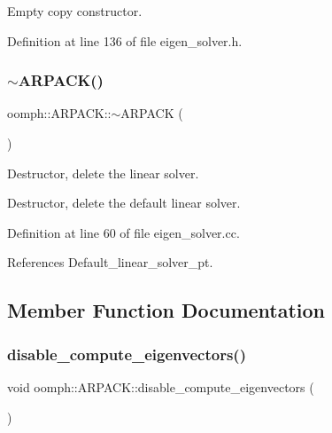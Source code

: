 Empty copy constructor. 



Definition at line 136 of file eigen\+\_\+solver.\+h.

\mbox{\label{classoomph_1_1ARPACK_a67b999708483787f4211a15feb71ed11}} 
\subsubsection{\texorpdfstring{$\sim$\+A\+R\+P\+A\+C\+K()}{~ARPACK()}}
{\footnotesize\ttfamily oomph\+::\+A\+R\+P\+A\+C\+K\+::$\sim$\+A\+R\+P\+A\+CK (\begin{DoxyParamCaption}{ }\end{DoxyParamCaption})\hspace{0.3cm}{\ttfamily [virtual]}}



Destructor, delete the linear solver. 

Destructor, delete the default linear solver. 

Definition at line 60 of file eigen\+\_\+solver.\+cc.



References Default\+\_\+linear\+\_\+solver\+\_\+pt.



\subsection{Member Function Documentation}
\mbox{\label{classoomph_1_1ARPACK_adfd771b9ef52ec5b0ee78918027679c0}} 
\subsubsection{\texorpdfstring{disable\+\_\+compute\+\_\+eigenvectors()}{disable\_compute\_eigenvectors()}}
{\footnotesize\ttfamily void oomph\+::\+A\+R\+P\+A\+C\+K\+::disable\+\_\+compute\+\_\+eigenvectors (\begin{DoxyParamCaption}{ }\end{DoxyParamCaption})\hspace{0.3cm}{\ttfamily [inline]}}



